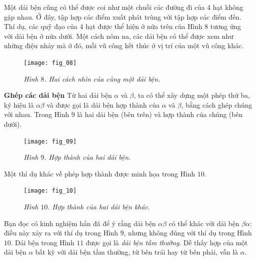 \begin{multicols}{2}
\begin{figure}[H]
	\end{figure}
	Một dải bện cũng có thể được coi như một chuỗi các đường đi của $4$ hạt không gặp nhau. Ở đây, tập hợp các điểm xuất phát trùng với tập hợp các điểm đến. Thí dụ, các quỹ đạo của $4$ hạt được thể hiện ở nửa trên của Hình $8$ tương ứng với dải bện ở nửa dưới. Một cách nôm na, các dải bện có thể được xem như những điệu nhảy mà ở đó, mỗi vũ công kết thúc ở vị trí của một vũ công khác.
	\begin{figure}[H]
		\vspace*{-5pt}
		\centering
		\captionsetup{labelformat= empty, justification=centering}
		\texttt{[image: fig\_08]}
		\caption{\small\textit{\color{duongvaotoanhoc}Hình $8$. Hai cách nhìn của cùng một dải bện.}}
		\vspace*{-10pt}
	\end{figure}
	\textbf{\color{duongvaotoanhoc}Ghép các dải bện}
	\vskip 0.05cm
	Từ hai dải bện $\alpha$ và $\beta$, ta có thể xây dựng một phép thứ ba, ký hiệu là $\alpha \beta$ và được gọi là dải bện hợp thành của $\alpha$ và $\beta$, bằng cách ghép chúng với nhau. Trong Hình $9$ là hai dải bện (bên trên) và hợp thành của chúng (bên dưới).
	\begin{figure}[H]
		\vspace*{-5pt}
		\centering
		\captionsetup{labelformat= empty, justification=centering}
		\texttt{[image: fig\_09]}
		\caption{\small\textit{\color{duongvaotoanhoc}Hình $9$. Hợp thành của hai dải bện.}}
		\vspace*{-5pt}
	\end{figure}
	Một thí dụ khác về phép hợp thành được minh họa trong Hình $10$.
	\begin{figure}[H]
		\vspace*{-5pt}
		\centering
		\captionsetup{labelformat= empty, justification=centering}
		\texttt{[image: fig\_10]}
		\caption{\small\textit{\color{duongvaotoanhoc}Hình $10$. Hợp thành của hai dải bện khác.}}
		\vspace*{-10pt}
	\end{figure}
	Bạn đọc có kinh nghiệm hẳn đã để ý rằng dải bện $\alpha \beta$ có thể khác với dải bện $\beta \alpha$: điều này xảy ra với thí dụ trong Hình $9$, nhưng không đúng với thí dụ trong Hình $10$.
	\vskip 0.1cm
	Dải bện trong Hình $11$ được gọi là \textit{dải bện tầm thường}. Dễ thấy hợp của một dải bện $\alpha$ bất kỳ với dải bện tầm thường, từ bên trái hay từ bên phải, vẫn là $\alpha$.
	\begin{figure}[H]
		\vspace*{-5pt}

\end{figure}
\end{multicols}
